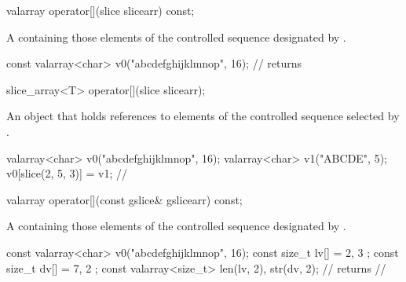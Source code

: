 %
\begin{itemdecl}
valarray operator[](slice slicearr) const;
\end{itemdecl}

\begin{itemdescr}
\pnum
\returns
A  containing those
elements of the controlled sequence designated by .
\begin{example}
\begin{codeblock}
const valarray<char> v0("abcdefghijklmnop", 16);
//  returns 
\end{codeblock}
\end{example}
\end{itemdescr}

%
\begin{itemdecl}
slice_array<T> operator[](slice slicearr);
\end{itemdecl}

\begin{itemdescr}
\pnum
\returns
An object that holds references to elements of the controlled
sequence selected by .
\begin{example}
\begin{codeblock}
valarray<char> v0("abcdefghijklmnop", 16);
valarray<char> v1("ABCDE", 5);
v0[slice(2, 5, 3)] = v1;
// 
\end{codeblock}
\end{example}
\end{itemdescr}

%
\begin{itemdecl}
valarray operator[](const gslice& gslicearr) const;
\end{itemdecl}

\begin{itemdescr}
\pnum
\returns
A  containing those
elements of the controlled sequence designated by .
\begin{example}
\begin{codeblock}
const valarray<char> v0("abcdefghijklmnop", 16);
const size_t lv[] = { 2, 3 };
const size_t dv[] = { 7, 2 };
const valarray<size_t> len(lv, 2), str(dv, 2);
//  returns
// 
\end{codeblock}
\end{example}
\end{itemdescr}

